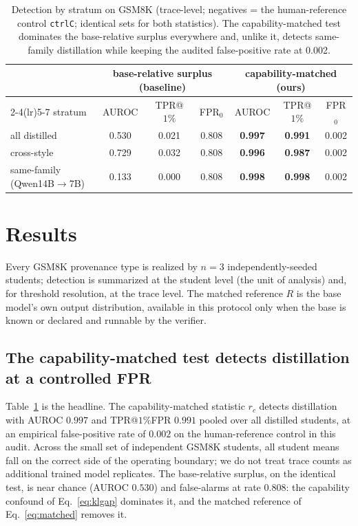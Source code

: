 \begin{table}[t]\centering\small
\caption{Detection by stratum on GSM8K (trace-level; negatives = the human-reference control \texttt{ctrlC}; identical sets for both statistics). The capability-matched test dominates the base-relative surplus everywhere and, unlike it, detects same-family distillation while keeping the audited false-positive rate at 0.002.}\label{tab:detection}
\begin{tabular}{lcccccc}\toprule
& \multicolumn{3}{c}{base-relative surplus (baseline)} & \multicolumn{3}{c}{\textbf{capability-matched (ours)}} \\
\cmidrule(lr){2-4}\cmidrule(lr){5-7}
stratum & AUROC & TPR@$1\%$ & FPR$_0$ & AUROC & TPR@$1\%$ & FPR$_0$ \\\midrule
all distilled & 0.530 & 0.021 & 0.808 & \textbf{0.997} & \textbf{0.991} & 0.002 \\
cross-style & 0.729 & 0.032 & 0.808 & \textbf{0.996} & \textbf{0.987} & 0.002 \\
same-family (Qwen14B$\to$7B) & 0.133 & 0.000 & 0.808 & \textbf{0.998} & \textbf{0.998} & 0.002 \\
\bottomrule\end{tabular}\end{table}

\section{Results}
\label{sec:results}
Every GSM8K provenance type is realized by $n=3$ independently-seeded students;
detection is summarized at the student level (the unit of analysis) and, for
threshold resolution, at the trace level. The matched reference $R$ is the base
model's own output distribution, available in this protocol only when the base is
known or declared and runnable by the verifier.

\subsection{The capability-matched test detects distillation at a controlled FPR}
Table~\ref{tab:detection} is the headline. The capability-matched statistic $r_c$ detects distillation with
AUROC $0.997$ and TPR@$1\%$FPR $0.991$ pooled over all distilled students, at an empirical
false-positive rate of $0.002$ on the human-reference control in this audit. Across
the small set of independent GSM8K students, all student means fall on the correct
side of the operating boundary; we do not treat trace counts as additional trained
model replicates. The base-relative
surplus, on the identical test, is near chance (AUROC $0.530$) and false-alarms at rate $0.808$: the
capability confound of Eq.~\eqref{eq:klgap} dominates it, and the matched reference of Eq.~\eqref{eq:matched}
removes it.

